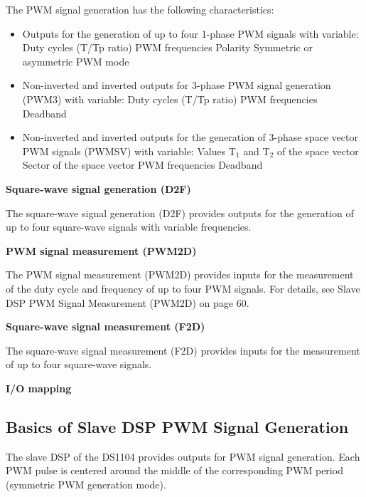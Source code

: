 The PWM signal generation has the following characteristics:
\begin{itemize}
    \item Outputs for the generation of up to four 1-phase PWM signals with variable:
    \subitem Duty cycles (T/Tp ratio)
    \subitem PWM frequencies
    \subitem Polarity
    \subitem Symmetric or asymmetric PWM mode
    \item Non-inverted and inverted outputs for 3-phase PWM signal generation (PWM3) with variable:
    \subitem Duty cycles (T/Tp ratio)
    \subitem PWM frequencies
    \subitem Deadband
    \item Non-inverted and inverted outputs for the generation of 3-phase space vector PWM signals (PWMSV) with variable:
    \subitem Values T$_1$ and T$_2$ of the space vector
    \subitem Sector of the space vector
    \subitem PWM frequencies
    \subitem Deadband
\end{itemize}

\noindent \textbf{Square-wave signal generation (D2F)}\par

The square-wave signal generation (D2F) provides outputs for the generation of up to four square-wave signals with variable frequencies.

\noindent \textbf{PWM signal measurement (PWM2D)}\par

The PWM signal measurement (PWM2D) provides inputs for the measurement of the duty cycle and frequency of up to four PWM signals. For details, see Slave DSP PWM Signal Measurement (PWM2D) on page 60.

\noindent \textbf{Square-wave signal measurement (F2D)}\par

The square-wave signal measurement (F2D) provides inputs for the measurement of up to four square-wave signals.

\noindent \textbf{I/O mapping}\par


\subsection{Basics of Slave DSP PWM Signal Generation}

The slave DSP of the DS1104 provides outputs for PWM signal generation. Each PWM pulse is centered around the middle of the corresponding PWM period (symmetric PWM generation mode).

